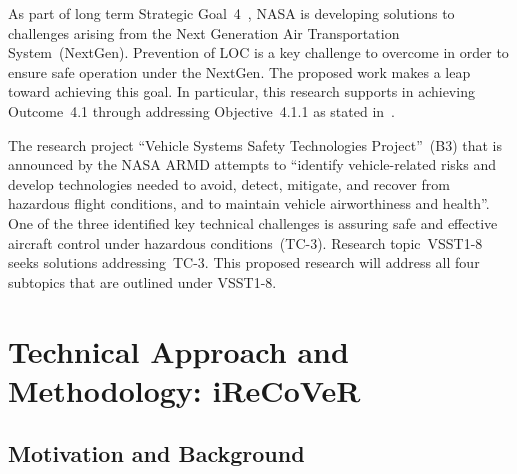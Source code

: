 \documentclass[letter,onecolumn,12pt]{aiaa-tc}
\begin{document}
As part of long term Strategic Goal~4~\cite{NASA_goals11}, NASA is developing solutions to challenges arising from the Next Generation Air Transportation System~(NextGen).
Prevention of LOC is a key challenge to overcome in order to ensure safe operation under the NextGen. The proposed work makes a leap toward achieving this goal. In particular, this research supports in achieving Outcome~4.1 through addressing Objective~4.1.1 as stated in~\cite{NASA_goals11}.


The research project ``Vehicle Systems Safety Technologies Project''~(B3) that is announced by the NASA ARMD attempts to ``identify vehicle-related risks and develop technologies needed to avoid, detect, mitigate, and recover from hazardous flight conditions, and to maintain vehicle airworthiness and health''. One of the three identified key technical challenges is assuring safe and effective aircraft control under hazardous conditions~\mbox{(TC-3)}. Research topic~VSST1-8 seeks solutions addressing~TC-3. This proposed research will address all four subtopics that are outlined under VSST1-8.


\section{Technical Approach and Methodology: iReCoVeR}

\subsection{Motivation and Background}
\end{document}
